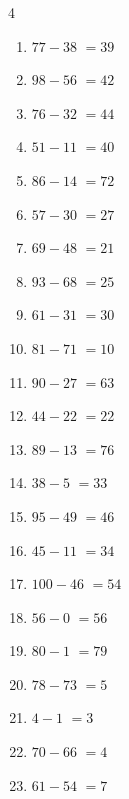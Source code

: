 \begin{multicols}{4}
\begin{enumerate}
  \item $77-38$
        $=39$

  \item $98-56$
        $=42$

  \item $76-32$
        $=44$

  \item $51-11$
        $=40$

  \item $86-14$
        $=72$

  \item $57-30$
        $=27$

  \item $69-48$
        $=21$

  \item $93-68$
        $=25$

  \item $61-31$
        $=30$

  \item $81-71$
        $=10$

  \item $90-27$
        $=63$

  \item $44-22$
        $=22$

  \item $89-13$
        $=76$

  \item $38-5$
        $=33$

  \item $95-49$
        $=46$

  \item $45-11$
        $=34$

\columnbreak %

  \item $100-46$
        $=54$

  \item $56-0$
        $=56$

  \item $80-1$
        $=79$

  \item $78-73$
        $=5$

  \item $4-1$
        $=3$

  \item $70-66$
        $=4$

  \item $61-54$
        $=7$


\end{enumerate}
\end{multicols}
